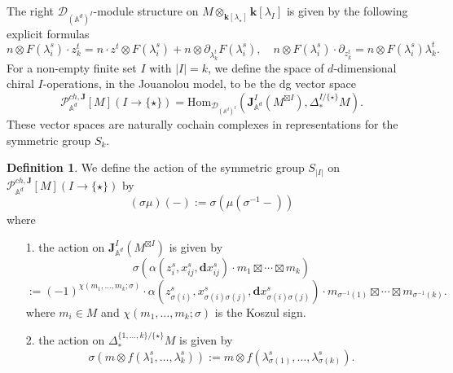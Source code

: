 \documentclass[11pt]{amsart}
\theoremstyle{definition}
\newtheorem{defn}[thm]{Definition}
\theoremstyle{remark}
\numberwithin{equation}{section}
\newcommand{\kk}{\mathbf{k}}
\begin{document}
The right $\mathcal{D}_{(\mathbb{A}^d)^{{I}}}$-module structure on $M\otimes_{\kk[\lambda_{\star}]}\kk[\lambda_I]$ is given by the following explicit formulas
$$
n\otimes F(\lambda^s_i)\cdot z^t_k=n \cdot z^t\otimes F(\lambda^s_i)+n\otimes \partial_{\lambda^t_k}F(\lambda^s_i),\quad n\otimes F(\lambda^s_i)\cdot \partial_{z^t_k}=n\otimes F(\lambda^s_i)\lambda^t_k.
$$
For a non-empty finite set $I$ with $|I|=k$, we define the space of $d$-dimensional chiral $I$-operations, in the Jouanolou model,
to be the dg vector space
$$
\mathcal{P}^{ch,\mathbf{J}}_{\mathbb{A}^d}[M](I\rightarrow \{\star\})=\mathrm{Hom}_{\mathcal{D}_{(\mathbb{A}^d)^{I}}}\left(\mathbf{J}_{\mathbb{A}^d}^{I}(M^{\boxtimes I}),\Delta^{I/\{\star\}}_*M\right).
$$
These vector spaces are naturally cochain complexes in representations for the symmetric group $S_k$.
\begin{defn}\label{SymmetricGroupAction}
    We define the action of the symmetric group $S_{|I|}$ on $\mathcal{P}^{ch,\mathbf{J}}_{\mathbb{A}^d}[M](I\rightarrow \{\star\})$ by
$$
(\sigma\mu)(-):=\sigma\left(\mu(\sigma^{-1}-)\right)
$$
where
\begin{itemize}
  \item[1.] the action on $\mathbf{J}_{\mathbb{A}^d}^{I}(M^{\boxtimes I})$ is given by
    $$
    \sigma\left(\alpha(z^s_i,x^s_{ij},\mathbf{d}x^s_{ij})\cdot m_1\boxtimes\cdots\boxtimes m_k\right)
    $$
    $$
    :=(-1)^{\chi(m_1,\dots,m_k;\sigma)}\cdot\alpha(z^s_{\sigma(i)},x^s_{\sigma(i)\sigma(j)},\mathbf{d}x^s_{\sigma(i)\sigma(j)})\cdot m_{\sigma^{-1}(1)}\boxtimes\cdots\boxtimes m_{\sigma^{-1}(k)}.
    $$
 where $m_i\in M$ and $\chi(m_1,\dots,m_k;\sigma)$ is the Koszul sign.
  \item[2.] the action on $\Delta_*^{\{1,\dots,k\}/\{\star\}}M$ is given by
    $$
    \sigma\left(m\otimes f(\lambda^s_1,\dots,\lambda^s_k)\right):=m\otimes f(\lambda^s_{\sigma(1)},\dots,\lambda^s_{\sigma(k)}).
    $$
\end{itemize}
\end{defn}
\end{document}
